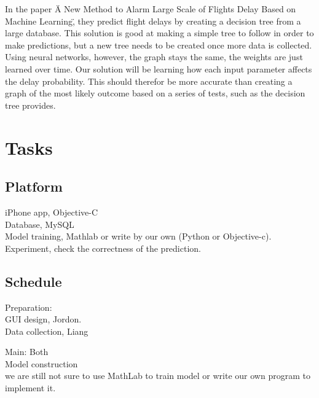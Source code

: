 \documentclass[12pt]{article}
\begin{document}
In the paper \"A New Method to Alarm Large Scale of Flights Delay Based on Machine 
Learning\", they predict flight delays by creating a decision tree from a large 
database. This solution is good at making a simple tree to follow in order to 
make predictions, but a new tree needs to be created once more data is collected.
Using neural networks, however, the graph stays the same, the weights are just
learned over time. Our solution will be learning how each input parameter affects 
the delay probability. This should therefor be more accurate than creating a graph 
of the most likely outcome based on a series of tests, such as the decision tree 
provides.

\section{Tasks}


\subsection{Platform}
iPhone app, Objective-C\\
Database, MySQL\\
Model training, Mathlab or write by our own (Python or Objective-c).\\
Experiment, check the correctness of the prediction.\\

\subsection{Schedule}
Preparation: \\
    GUI design, Jordon. \\
    Data collection, Liang

Main: Both\\
    Model construction \\  
    we are still not sure to use MathLab to train model or write our
    own program to implement it.
\end{document}
